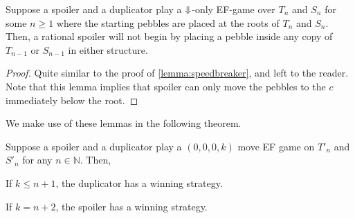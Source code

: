 \documentclass[a4paper,UKenglish,cleveref, autoref, thm-restate, numberwithinsect]{lipics-v2021}
\def\Darrow{\ensuremath\mathord{\Downarrow}}
\begin{document}
\begin{lemma}
    Suppose a spoiler and a duplicator play a $\Darrow$-only EF-game over $T_n$ and $S_n$ for some $n \geq 1$ where the starting pebbles are placed at the roots of $T_n$ and $S_n$. Then, a rational spoiler will not begin by placing a pebble inside any copy of $T_{n - 1}$ or $S_{n - 1}$ in either structure.
\end{lemma}
\begin{proof}
    Quite similar to the proof of \cref{lemma:speedbreaker}, and left to the reader. Note that this lemma implies that spoiler can only move the pebbles to the $c$ immediately below the root.
\end{proof}
We make use of these lemmas in the following theorem.
\begin{theorem}
    \label{theorem:working-of-darrow-game}
    Suppose a spoiler and a duplicator play a $(0, 0, 0, k)$ move EF game on $T'_n$ and $S'_n$ for any $n \in \mathbb{N}$. Then,
    \begin{bracketenumerate}
        \item If $k \leq n + 1$, the duplicator has a winning strategy.
        \item If $k = n + 2$, the spoiler has a winning strategy.
    \end{bracketenumerate}
\end{theorem}
\end{document}
